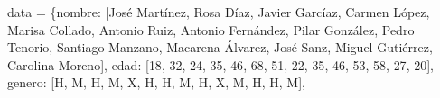 \documentclass[
  letterpaper,
  DIV=11,
  numbers=noendperiod]{scrreprt}
\newenvironment{Shaded}{\begin{snugshade}}{\end{snugshade}}
\newcommand{\DecValTok}[1]{\textcolor[rgb]{0.68,0.00,0.00}{#1}}
\newcommand{\NormalTok}[1]{\textcolor[rgb]{0.00,0.23,0.31}{#1}}
\newcommand{\OperatorTok}[1]{\textcolor[rgb]{0.37,0.37,0.37}{#1}}
\newcommand{\StringTok}[1]{\textcolor[rgb]{0.13,0.47,0.30}{#1}}
\begin{document}
\begin{Shaded}
\begin{Highlighting}[]
\NormalTok{data }\OperatorTok{=}\NormalTok{ \{}\StringTok{\textquotesingle{}nombre\textquotesingle{}}\NormalTok{: [}\StringTok{\textquotesingle{}José Martínez\textquotesingle{}}\NormalTok{, }\StringTok{\textquotesingle{}Rosa Díaz\textquotesingle{}}\NormalTok{, }\StringTok{\textquotesingle{}Javier Garcíaz\textquotesingle{}}\NormalTok{, }\StringTok{\textquotesingle{}Carmen López\textquotesingle{}}\NormalTok{, }\StringTok{\textquotesingle{}Marisa Collado\textquotesingle{}}\NormalTok{, }\StringTok{\textquotesingle{}Antonio Ruiz\textquotesingle{}}\NormalTok{, }\StringTok{\textquotesingle{}Antonio Fernández\textquotesingle{}}\NormalTok{, }
                   \StringTok{\textquotesingle{}Pilar González\textquotesingle{}}\NormalTok{, }\StringTok{\textquotesingle{}Pedro Tenorio\textquotesingle{}}\NormalTok{, }\StringTok{\textquotesingle{}Santiago Manzano\textquotesingle{}}\NormalTok{, }\StringTok{\textquotesingle{}Macarena Álvarez\textquotesingle{}}\NormalTok{, }\StringTok{\textquotesingle{}José Sanz\textquotesingle{}}\NormalTok{, }\StringTok{\textquotesingle{}Miguel Gutiérrez\textquotesingle{}}\NormalTok{, }\StringTok{\textquotesingle{}Carolina Moreno\textquotesingle{}}\NormalTok{],}
        \StringTok{\textquotesingle{}edad\textquotesingle{}}\NormalTok{: [}\DecValTok{18}\NormalTok{, }\DecValTok{32}\NormalTok{, }\DecValTok{24}\NormalTok{, }\DecValTok{35}\NormalTok{, }\DecValTok{46}\NormalTok{, }\DecValTok{68}\NormalTok{, }\DecValTok{51}\NormalTok{, }\DecValTok{22}\NormalTok{, }\DecValTok{35}\NormalTok{, }\DecValTok{46}\NormalTok{, }\DecValTok{53}\NormalTok{, }\DecValTok{58}\NormalTok{, }\DecValTok{27}\NormalTok{, }\DecValTok{20}\NormalTok{],}
        \StringTok{\textquotesingle{}genero\textquotesingle{}}\NormalTok{: [}\StringTok{\textquotesingle{}H\textquotesingle{}}\NormalTok{, }\StringTok{\textquotesingle{}M\textquotesingle{}}\NormalTok{, }\StringTok{\textquotesingle{}H\textquotesingle{}}\NormalTok{, }\StringTok{\textquotesingle{}M\textquotesingle{}}\NormalTok{, }\StringTok{\textquotesingle{}X\textquotesingle{}}\NormalTok{, }\StringTok{\textquotesingle{}H\textquotesingle{}}\NormalTok{, }\StringTok{\textquotesingle{}H\textquotesingle{}}\NormalTok{, }\StringTok{\textquotesingle{}M\textquotesingle{}}\NormalTok{, }\StringTok{\textquotesingle{}H\textquotesingle{}}\NormalTok{, }\StringTok{\textquotesingle{}X\textquotesingle{}}\NormalTok{, }\StringTok{\textquotesingle{}M\textquotesingle{}}\NormalTok{, }\StringTok{\textquotesingle{}H\textquotesingle{}}\NormalTok{, }\StringTok{\textquotesingle{}H\textquotesingle{}}\NormalTok{, }\StringTok{\textquotesingle{}M\textquotesingle{}}\NormalTok{],}

\end{Highlighting}
\end{Shaded}
\end{document}
